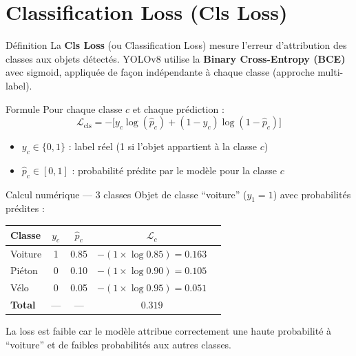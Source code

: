 \documentclass[12pt, a4paper]{report}
\begin{document}
\section{Classification Loss (Cls Loss)}

\begin{definitionbox}{Définition}
  La \textbf{Cls Loss} (ou Classification Loss) mesure l'erreur d'attribution
  des classes aux objets détectés. YOLOv8 utilise la
  \textbf{Binary Cross-Entropy (BCE)} avec sigmoid, appliquée de façon
  indépendante à chaque classe (approche multi-label).
\end{definitionbox}

\begin{formulebox}{Formule}
  Pour chaque classe $c$ et chaque prédiction :
  \[
    \mathcal{L}_{\text{cls}} = -\bigl[y_c \log(\hat{p}_c) +
    (1 - y_c)\log(1 - \hat{p}_c)\bigr]
  \]
  \begin{itemize}
    \item $y_c \in \{0, 1\}$ : label réel (1 si l'objet appartient à la classe $c$)
    \item $\hat{p}_c \in [0,1]$ : probabilité prédite par le modèle pour la classe $c$
  \end{itemize}
\end{formulebox}

\begin{examplebox}{Calcul numérique — 3 classes}
  Objet de classe ``voiture'' ($y_1=1$) avec probabilités prédites :
  \begin{center}
  \begin{tabular}{lcccc}
    \toprule
    \textbf{Classe} & $y_c$ & $\hat{p}_c$ & $\mathcal{L}_c$ \\
    \midrule
    Voiture  & 1 & 0.85 & $-(1 \times \log 0.85) = 0.163$ \\
    Piéton   & 0 & 0.10 & $-(1 \times \log 0.90) = 0.105$ \\
    Vélo     & 0 & 0.05 & $-(1 \times \log 0.95) = 0.051$ \\
    \midrule
    \textbf{Total} & — & — & $\mathbf{0.319}$ \\
    \bottomrule
  \end{tabular}
  \end{center}
  La loss est faible car le modèle attribue correctement une haute probabilité à
  ``voiture'' et de faibles probabilités aux autres classes.
\end{examplebox}
\end{document}
